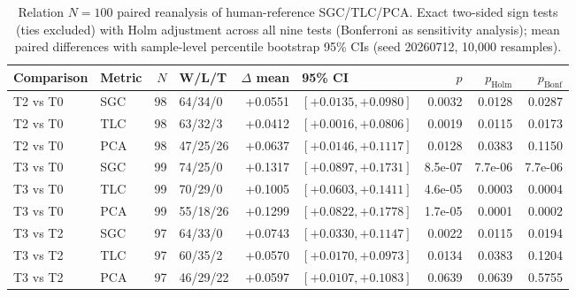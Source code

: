 \begin{table}[t]
\centering
\small
\caption{Relation $N{=}100$ paired reanalysis of human-reference SGC/TLC/PCA. Exact two-sided sign tests (ties excluded) with Holm adjustment across all nine tests (Bonferroni as sensitivity analysis); mean paired differences with sample-level percentile bootstrap 95\% CIs (seed 20260712, 10,000 resamples).}
\label{tab:relation100-stats}
\begin{tabular}{llrlrlrrr}
\toprule
Comparison & Metric & $N$ & W/L/T & $\Delta$ mean & 95\% CI & $p$ & $p_{\mathrm{Holm}}$ & $p_{\mathrm{Bonf}}$ \\
\midrule
T2 vs T0 & SGC & 98 & 64/34/0 & +0.0551 & $[+0.0135, +0.0980]$ & 0.0032 & 0.0128 & 0.0287 \\
T2 vs T0 & TLC & 98 & 63/32/3 & +0.0412 & $[+0.0016, +0.0806]$ & 0.0019 & 0.0115 & 0.0173 \\
T2 vs T0 & PCA & 98 & 47/25/26 & +0.0637 & $[+0.0146, +0.1117]$ & 0.0128 & 0.0383 & 0.1150 \\
T3 vs T0 & SGC & 99 & 74/25/0 & +0.1317 & $[+0.0897, +0.1731]$ & 8.5e-07 & 7.7e-06 & 7.7e-06 \\
T3 vs T0 & TLC & 99 & 70/29/0 & +0.1005 & $[+0.0603, +0.1411]$ & 4.6e-05 & 0.0003 & 0.0004 \\
T3 vs T0 & PCA & 99 & 55/18/26 & +0.1299 & $[+0.0822, +0.1778]$ & 1.7e-05 & 0.0001 & 0.0002 \\
T3 vs T2 & SGC & 97 & 64/33/0 & +0.0743 & $[+0.0330, +0.1147]$ & 0.0022 & 0.0115 & 0.0194 \\
T3 vs T2 & TLC & 97 & 60/35/2 & +0.0570 & $[+0.0170, +0.0973]$ & 0.0134 & 0.0383 & 0.1204 \\
T3 vs T2 & PCA & 97 & 46/29/22 & +0.0597 & $[+0.0107, +0.1083]$ & 0.0639 & 0.0639 & 0.5755 \\
\bottomrule
\end{tabular}
\end{table}